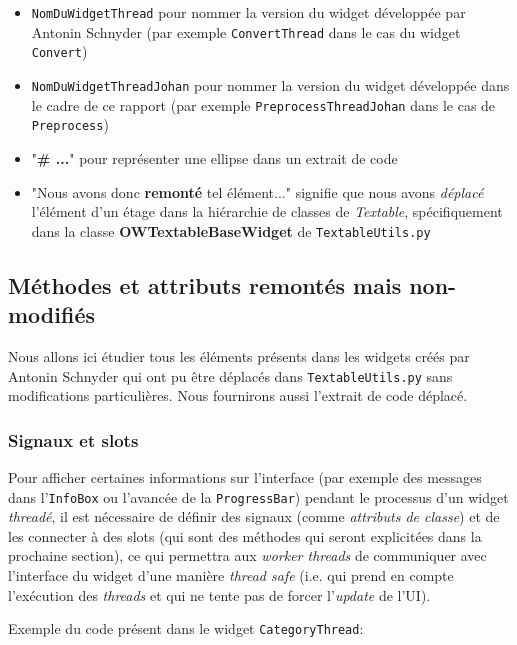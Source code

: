 \documentclass{article}
\begin{document}
\begin{itemize}
    \item \texttt{NomDuWidgetThread} pour nommer la version du widget développée par Antonin Schnyder (par exemple \texttt{ConvertThread} dans le cas du widget \texttt{Convert})
    \item \texttt{NomDuWidgetThreadJohan} pour nommer la version du widget  développée dans le cadre de ce rapport (par exemple \texttt{PreprocessThreadJohan} dans le cas de \texttt{Preprocess})
    \item "\textbf{\# ...}" pour représenter une ellipse dans un extrait de code
    \item "Nous avons donc \textbf{remonté} tel élément..." signifie que nous avons \textit{déplacé} l'élément d'un étage dans la hiérarchie de classes de \textit{Textable}, spécifiquement dans la classe \textbf{OWTextableBaseWidget} de \texttt{TextableUtils.py} 
\end{itemize}

\subsection{Méthodes et attributs remontés mais non-modifiés}

Nous allons ici étudier tous les éléments présents dans les widgets créés par Antonin Schnyder qui ont pu être déplacés dans \texttt{TextableUtils.py} sans modifications particulières. Nous fournirons aussi l'extrait de code déplacé.

\subsubsection{Signaux et slots}

Pour afficher certaines informations sur l'interface (par exemple des messages dans l'\texttt{InfoBox} ou l'avancée de la \texttt{ProgressBar}) pendant le processus d'un widget \textit{threadé}, il est nécessaire de définir des signaux (comme \textit{attributs de classe}) et de les connecter à des slots (qui sont des méthodes qui seront explicitées dans la prochaine section), ce qui permettra aux \textit{worker threads} de communiquer avec l'interface du widget d'une manière \textit{thread safe} (i.e. qui prend en compte l'exécution des \textit{threads} et qui ne tente pas de forcer l'\textit{update} de l'UI). 
\newline

Exemple du code présent dans le widget \texttt{CategoryThread}:
\end{document}

